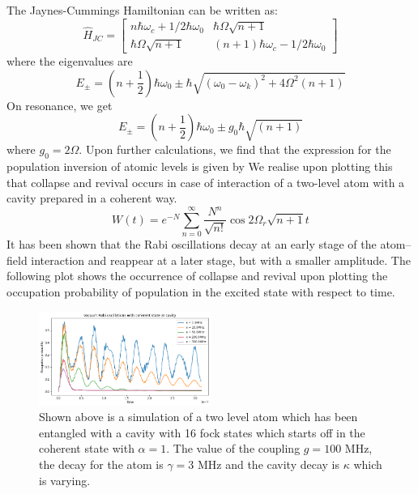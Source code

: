 \documentclass[%
 reprint,
 amsmath,amssymb,
 aps,
]{revtex4-2}
\begin{document}
The Jaynes-Cummings Hamiltonian can be written as:
\begin{equation}
\hat{H}_{JC}=
 \begin{bmatrix}
 n\hbar\omega_c+1/2\hbar \omega_0 & \hbar\Omega\sqrt{n+1} \\
 \hbar\Omega\sqrt{n+1} &  (n+1)\hbar\omega_c-1/2\hbar \omega_0
 \end{bmatrix}   
\end{equation}
where the eigenvalues are 
\begin{equation}
    E_\pm = (n+\frac{1}{2})\hbar\omega_0 \pm \hbar\sqrt{(\omega_0-\omega_k)^2+4\Omega^2(n+1)}
\end{equation}
On resonance, we get 
\begin{equation}
    E_\pm = (n+\frac{1}{2})\hbar\omega_0 \pm g_0\hbar\sqrt{(n+1)}
\end{equation}
where $g_0=2\Omega$.
Upon further calculations\cite{Collapse}, we find that the expression for the population inversion of atomic levels is given by 
We realise upon plotting this that collapse and revival occurs in case of interaction of a two-level atom with a cavity prepared
in a coherent way.
\begin{equation}
    W(t)=e^{-N}\sum\limits_{n=0}^\infty\frac{N^n}{\sqrt{n!}}\cos{2\Omega_r\sqrt{n+1}t}
\end{equation}
It has been shown \cite{PhysRevLett.44.1323} that the Rabi
oscillations decay at an early stage of the atom–field
interaction and reappear at a later stage, but with a
smaller amplitude. The following plot shows the occurrence of collapse and revival upon plotting the occupation probability of population in the excited state with respect to time.
\begin{figure}[ht]
    \centering
    \includegraphics[width=0.5\textwidth]{images/coherent rabi.png}
    \caption{Shown above is a simulation of a two level atom which has been entangled with a cavity with 16 fock states which starts off in the coherent state with $\alpha=1$. The value of the coupling $g = 100$ MHz, the decay for the atom is $\gamma = 3$ MHz and the cavity decay is $\kappa$ which is varying.}
\end{figure}
\end{document}
